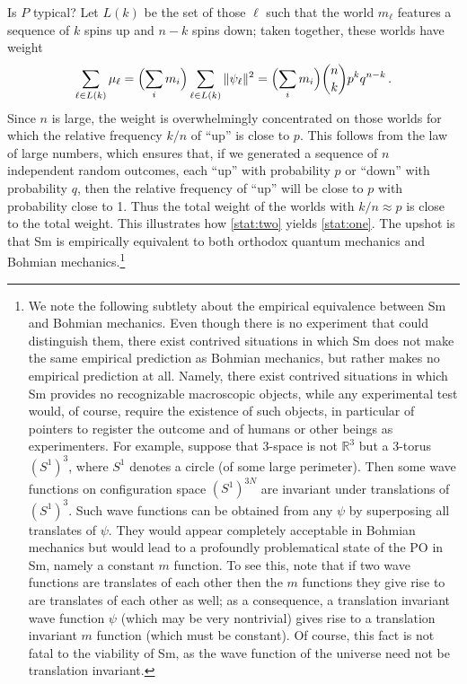 \documentclass[12pt]{article}
\newcommand{\RRR}{\mathbb{R}}
\newcommand{\num}{n}
\newcommand{\Lset}{L}
\newcommand{\x}[1]{{#1}}
\begin{document}
Is $P$ typical? Let $\Lset(k)$ be the set of those $\ell$ such that the world $m_\ell$ features a sequence of $k$ spins up and $\num-k$ spins down; taken together, these worlds have weight
\begin{equation}
\sum_{\ell\in\Lset(k)}\mu_\ell = 
\Bigl(\sum_i m_i\Bigr)\sum_{\ell\in\Lset(k)} \|\psi_\ell\|^2= 
\Bigl(\sum_i m_i\Bigr) \binom{\num}{k} p^k q^{\num-k}\,.
\end{equation}
Since $\num$ is large, the weight is overwhelmingly concentrated on those worlds for which the relative frequency $k/\num$ of ``up'' is close to $p$. This follows from the law of large numbers, which ensures that, if we generated a sequence of $\num$ independent random outcomes, each ``up'' with probability $p$  or ``down'' with probability $q$, then the relative frequency of ``up'' will be close to $p$ with probability close to 1. Thus the total weight of the worlds with $k/\num\approx p$ is close to the total weight. This illustrates how \eqref{stat:two} yields \eqref{stat:one}. The upshot is that Sm is empirically equivalent to both orthodox quantum mechanics and Bohmian mechanics.\footnote{We note the following subtlety about the empirical equivalence between Sm and Bohmian mechanics. Even though there is no experiment that could distinguish them, there exist contrived situations in which Sm does not make the same empirical prediction as Bohmian mechanics, but rather makes no empirical prediction at all. Namely, there exist contrived situations in which Sm provides no recognizable macroscopic objects, while any experimental test would, of course, require the existence of \x{such} objects, in particular of pointers to register the outcome and of humans or other beings as experimenters. For example, suppose that 3-space is not $\RRR^3$ but a 3-torus $(S^1)^3$, where $S^1$ denotes a circle (of some large perimeter). Then some wave functions on configuration space $(S^1)^{3N}$ are invariant under translations of $(S^1)^3$. Such wave functions can be obtained from any $\psi$ by superposing all translates of $\psi$. They would appear completely acceptable in Bohmian mechanics but would lead to a profoundly problematical state of the PO in Sm, namely a constant $m$ function. To see this, note that if two wave functions are translates of each other then the $m$ functions they give rise to are translates of each other as well; as a consequence, a translation invariant wave function $\psi$ (which may be very nontrivial) gives rise to a translation invariant $m$ function (which must be constant). Of course, this fact is not fatal to the viability of Sm, as  the wave function of the universe need not  be translation invariant.}
\end{document}
